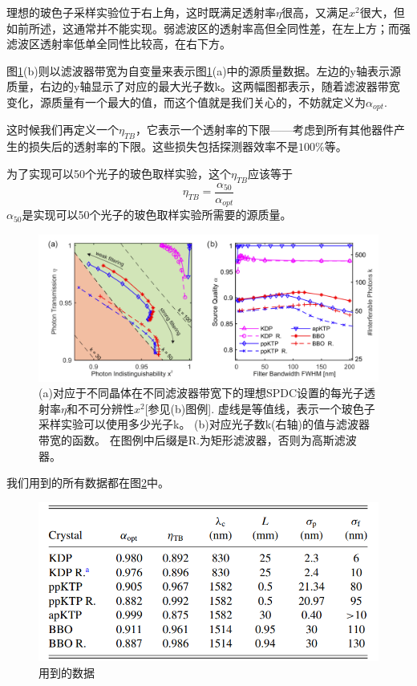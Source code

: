 理想的玻色子采样实验位于右上角，这时既满足透射率$\eta$很高，又满足$x^2$很大，但如前所述，这通常并不能实现。弱滤波区的透射率高但全同性差，在左上方；而强滤波区透射率低单全同性比较高，在右下方。

图\ref{fig:result1}(b)则以滤波器带宽为自变量来表示图\ref{fig:result1}(a)中的源质量数据。左边的y轴表示源质量，右边的y轴显示了对应的最大光子数k。这两幅图都表示，随着滤波器带宽变化，源质量有一个最大的值，而这个值就是我们关心的，不妨就定义为$\alpha_{opt}$.

这时候我们再定义一个$\eta_{TB}$，它表示一个透射率的下限——考虑到所有其他器件产生的损失后的透射率的下限。这些损失包括探测器效率不是$100\%$等。

为了实现可以50个光子的玻色取样实验，这个$\eta_{TB}$应该等于
\[\eta_{TB}=\frac{\alpha_{50}}{\alpha_{opt}}\]
$\alpha_{50}$是实现可以50个光子的玻色取样实验所需要的源质量。


\begin{figure}[ht]
	\centering
	\includegraphics[scale=0.25]{pic/result1}
	\caption{(a)对应于不同晶体在不同滤波器带宽下的理想SPDC设置的每光子透射率$\eta$和不可分辨性$x^2$[参见(b)图例]. 虚线是等值线，表示一个玻色子采样实验可以使用多少光子k。
(b)对应光子数k(右轴)的值与滤波器带宽的函数。
在图例中后缀是R.为矩形滤波器，否则为高斯滤波器。}
	\label{fig:result1}
\end{figure}

我们用到的所有数据都在图\ref{fig:table}中。

\begin{figure}[ht]
	\centering
	\includegraphics[scale=0.5]{pic/table}
	\caption{用到的数据}
	\label{fig:table}
\end{figure}

